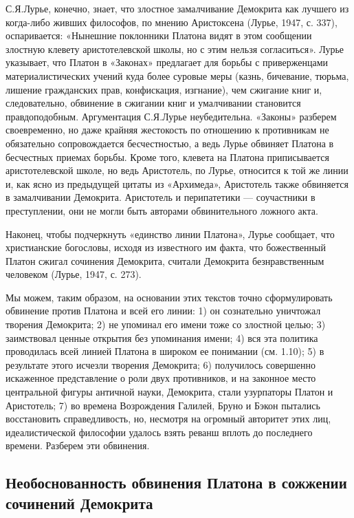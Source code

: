 С.Я.Лурье,  конечно, знает,  что злостное  замалчивание Демокрита  как
лучшего из когда-либо живших  философов, по мнению Аристоксена (Лурье,
1947, с. 337), оспаривается: «Нынешние поклонники Платона видят в этом
сообщении  злостную клевету  аристотелевской школы,  но с  этим нельзя
согласиться». Лурье  указывает, что Платон в  «Законах» предлагает для
борьбы с  приверженцами материалистических  учений куда  более суровые
меры (казнь, бичевание, тюрьма, лишение гражданских прав, конфискация,
изгнание), чем  сжигание книг  и, следовательно, обвинение  в сжигании
книг и  умалчивании становится правдоподобным.  Аргументация С.Я.Лурье
неубедительна.  «Законы»   разберем  своевременно,  но   даже  крайняя
жестокость по  отношению к  противникам не  обязательно сопровождается
бесчестностью,  а ведь  Лурье  обвиняет Платона  в бесчестных  приемах
борьбы. Кроме  того, клевета на Платона  приписывается аристотелевской
школе, но ведь  Аристотель, по Лурье, относится к той  же линии и, как
ясно из предыдущей цитаты из «Архимеда», Аристотель также обвиняется в
замалчивании Демокрита.  Аристотель и  перипатетики ---  соучастники в
преступлении, они не могли быть авторами обвинительного ложного акта.

Наконец, чтобы  подчеркнуть «единство линии Платона»,  Лурье сообщает,
что  христианские  богословы,  исходя  из  известного  им  факта,  что
божественный  Платон  сжигал  сочинения Демокрита,  считали  Демокрита
безнравственным человеком (Лурье, 1947, с. 273).

Мы   можем,   таким  образом,   на   основании   этих  текстов   точно
сформулировать  обвинение  против Платона  и  всей  его линии:  1)  он
сознательно  уничтожал творения  Демокрита; 2)  не упоминал  его имени
тоже со злостной целью; 3)  заимствовал ценные открытия без упоминания
имени; 4) вся  эта политика проводилась всей линией  Платона в широком
ее  понимании  (см. 1.10);  5)  в  результате этого  исчезли  творения
Демокрита; 6)  получилось совершенно  искаженное представление  о роли
двух  противников, и  на  законное место  центральной фигуры  античной
науки,  Демокрита,  стали  узурпаторы   Платон  и  Аристотель;  7)  во
времена  Возрождения  Галилей,  Бруно и  Бэкон  пытались  восстановить
справедливость,  но,   несмотря  на   огромный  авторитет   этих  лиц,
идеалистической философии  удалось взять  реванш вплоть  до последнего
времени. Разберем эти обвинения.

\subsection{Необоснованность  обвинения Платона  в сожжении  сочинений
Демокрита}

